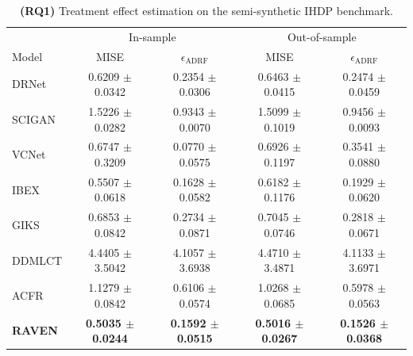 \documentclass[twoside]{article}
\theoremstyle{plain}
\theoremstyle{definition}
\theoremstyle{remark}
\newtheorem{proof sketch}[theorem]{Proof Sketch}
\begin{document}
\begin{table}
\centering
\caption{\textbf{(RQ1)} Treatment effect estimation on the semi-synthetic IHDP benchmark.}
\footnotesize
\label{Table3}
\begin{tabular}{lcccc}
\toprule
 & \multicolumn{2}{c}{In-sample} & \multicolumn{2}{c}{Out-of-sample} \\
\cmidrule(lr){2-3} \cmidrule(lr){4-5}
Model & MISE & $\epsilon_{\text{ADRF}}$ & MISE & $\epsilon_{\text{ADRF}}$ \\
\midrule

DRNet & 0.6209 $\pm$ 0.0342 & 0.2354 $\pm$ 0.0306 & 0.6463 $\pm$ 0.0415 & 0.2474 $\pm$ 0.0459 \\
SCIGAN & 1.5226 $\pm$ 0.0282 & 0.9343 $\pm$ 0.0070 & 1.5099 $\pm$ 0.1019 & 0.9456 $\pm$ 0.0093 \\
VCNet & 0.6747 $\pm$ 0.3209 & 0.0770 $\pm$ 0.0575 & 0.6926 $\pm$ 0.1197 & 0.3541 $\pm$ 0.0880 \\
IBEX & 0.5507 $\pm$ 0.0618& 0.1628 $\pm$ 0.0582& 0.6182 $\pm$ 0.1176 & 0.1929 $\pm$ 0.0620 \\
GIKS & 0.6853 $\pm$ 0.0842 & 0.2734 $\pm$ 0.0871 & 0.7045 $\pm$ 0.0746 & 0.2818 $\pm$ 0.0671 \\
DDMLCT & 4.4405 $\pm$ 3.5042 & 4.1057 $\pm$ 3.6938 & 4.4710 $\pm$ 3.4871 & 4.1133 $\pm$ 3.6971 \\
ACFR & 1.1279 $\pm$ 0.0842 & 0.6106 $\pm$ 0.0574 & 1.0268 $\pm$ 0.0685 & 0.5978 $\pm$ 0.0563 \\
\rowcolor{blue!10}
\textbf{RAVEN} & \textbf{0.5035 $\pm$ 0.0244}& \textbf{0.1592 $\pm$ 0.0515}& \textbf{0.5016 $\pm$ 0.0267}& \textbf{0.1526 $\pm$ 0.0368}\\
\bottomrule
\end{tabular}
\end{table}

\begin{table}[h]
\centering
\caption{\textbf{(RQ2)} Variable selection on the semi-synthetic IHDP benchmark. We report FDR and TPR for confounders $c$, outcome predictors $p$, and their union $c \cup p$. }
\label{Table4}
\end{table}
\end{document}
